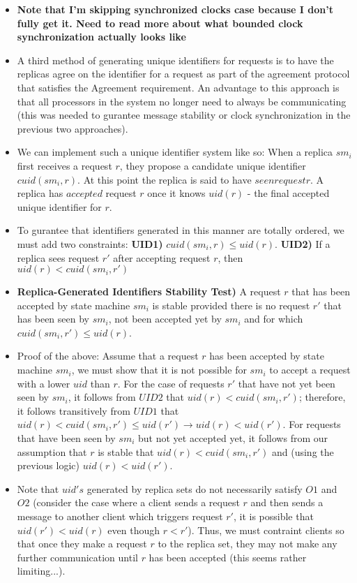 \documentclass[a4paper]{article}
\begin{document}
\begin{itemize}
\begin{itemize}
\begin{itemize}
\item \textbf{Note that I'm skipping synchronized clocks case because I don't fully get it. Need to read more about what bounded clock synchronization actually looks like}

\item A third method of generating unique identifiers for requests is to have the replicas agree on the identifier for a request as part of the agreement protocol that satisfies the Agreement requirement. An advantage to this approach is that all processors in the system no longer need to always be communicating (this was needed to gurantee message stability or clock synchronization in the previous two approaches).

\item We can implement such a unique identifier system like so: When a replica $sm_i$ first receives a request $r$, they propose a candidate unique identifier $cuid(sm_i, r)$. At this point the replica is said to have $seen request r$. A replica has $accepted$ request $r$ once it knows $uid(r)$ - the final accepted unique identifier for $r$.

\item To gurantee that identifiers generated in this manner are totally ordered, we must add two constraints: \textbf{UID1)} $cuid(sm_i, r) \le uid(r)$. \textbf{UID2)} If a replica sees request $r'$ after accepting request $r$, then $uid(r) < cuid(sm_i, r')$ 

\item \textbf{Replica-Generated Identifiers Stability Test)} A request $r$ that has been accepted by state machine $sm_i$ is stable provided there is no request $r'$ that has been seen by $sm_i$, not been accepted yet by $sm_i$ and for which $cuid(sm_i, r') \le uid(r)$.  

\item Proof of the above: Assume that a request $r$ has been accepted by state machine $sm_i$, we must show that it is not possible for $sm_i$ to accept a request with a lower $uid$ than $r$. For the case of requests $r'$ that have not yet been seen by $sm_i$, it follows from $UID2$ that $uid(r) < cuid(sm_i, r')$; therefore, it follows transitively from $UID1$ that $uid(r) < cuid(sm_i, r') \le uid(r') \rightarrow uid(r) < uid(r')$. For requests that have been seen by $sm_i$ but not yet accepted yet, it follows from our assumption that $r$ is stable that $uid(r) < cuid(sm_i, r')$ and (using the previous logic) $uid(r) < uid(r')$.

\item Note that $uid's$ generated by replica sets do not necessarily satisfy $O1$ and $O2$ (consider the case where a client sends a request $r$ and then sends a message to another client which triggers request $r'$, it is possible that $uid(r') < uid(r)$ even though $r < r'$). Thus, we must contraint clients so that once they make a request $r$ to the replica set, they may not make any further communication until $r$ has been accepted (this seems rather limiting...).


\end{itemize}
\end{itemize}
\end{itemize}
\end{document}
